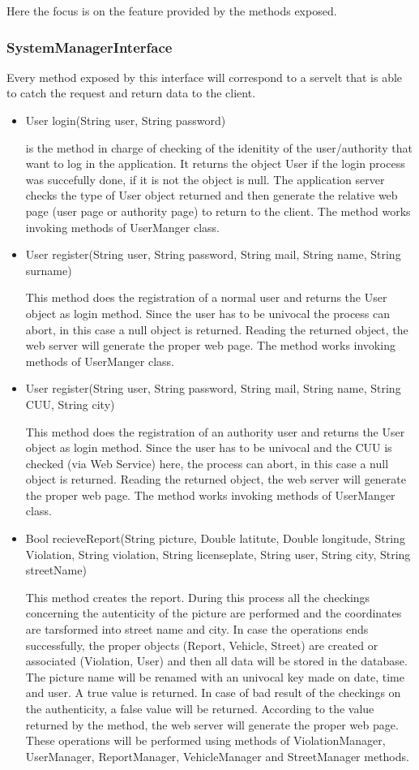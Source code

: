 Here the focus is on the feature provided by the methods exposed.

\subsubsection{SystemManagerInterface}
Every method exposed by this interface will correspond to a servelt that is able to catch the request and return data to the client.
\begin{itemize}
	\item 
	User login(String user, String password)
	
	is the method in charge of checking of the idenitity of the user/authority that want to log in the application. It returns the object User if the login process was succefully done, if it is not the object is null. The application server checks the type of User object returned and then generate the relative web page (user page or authority page) to return to the client.
	The method works invoking methods of UserManger class.
	
	\item 
	User register(String user, String password, String mail, String name, String surname)
	
	This method does the registration of a normal user and returns the User object as login method. Since the user has to be univocal the process can abort, in this case a null object is returned.
	Reading the returned object, the web server will generate the proper web page.
	The method works invoking methods of UserManger class.
	
	\item 
	User register(String user, String password, String mail, String name, String CUU, String city)
	
	This method does the registration of an authority user and returns the User object as login method. Since the user has to be univocal and the CUU is checked (via Web Service) here, the process can abort, in this case a null object is returned.
	Reading the returned object, the web server will generate the proper web page.
	The method works invoking methods of UserManger class.
	
	\item
	 Bool recieveReport(String picture, Double latitute, Double longitude, String Violation, String violation, String licenseplate, String user, String city, String streetName)
	 
	 This method creates the report. During this process all the checkings concerning the autenticity of the picture are performed and the coordinates are tarsformed into street name and city. In case the operations ends successfully, the proper objects (Report, Vehicle, Street) are created or associated (Violation, User) and then all data will be stored in the database. The picture name will be renamed with an univocal key made on date, time and user. A true value is returned.
	 In case of bad result of the checkings on the authenticity, a false value will be returned.
	 According to the value returned by the method, the web server will generate the proper web page.
	 These operations will be performed using methods of ViolationManager, UserManager, ReportManager, VehicleManager and  StreetManager methods.
	 

\end{itemize}
